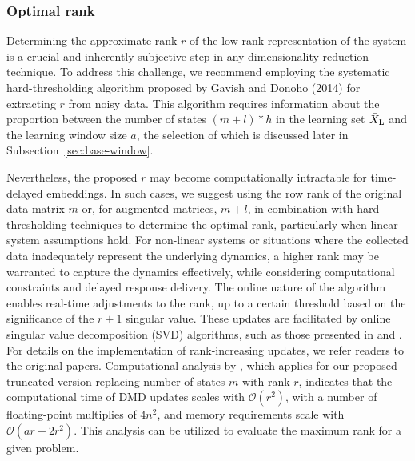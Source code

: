 \subsubsection{Optimal rank}
Determining the approximate rank \( r \) of the low-rank representation of the system is a crucial and inherently subjective step in any dimensionality reduction technique. To address this challenge, we recommend employing the systematic hard-thresholding algorithm proposed by Gavish and Donoho (2014) for extracting \( r \) from noisy data. This algorithm requires information about the proportion between the number of states \((m + l) * h\) in the learning set \(\bar{X} _{\text{L}}\) and the learning window size \(a\), the selection of which is discussed later in Subsection~\ref{sec:base-window}.

Nevertheless, the proposed \( r \) may become computationally intractable for time-delayed embeddings. In such cases, we suggest using the row rank of the original data matrix \( m \) or, for augmented matrices, \( m + l \), in combination with hard-thresholding techniques to determine the optimal rank, particularly when linear system assumptions hold. For non-linear systems or situations where the collected data inadequately represent the underlying dynamics, a higher rank may be warranted to capture the dynamics effectively, while considering computational constraints and delayed response delivery. The online nature of the algorithm enables real-time adjustments to the rank, up to a certain threshold based on the significance of the \(r + 1\) singular value. These updates are facilitated by online singular value decomposition (SVD) algorithms, such as those presented in \citet{Brand2006} and \citet{Zhang2022}. For details on the implementation of rank-increasing updates, we refer readers to the original papers. Computational analysis by \citet{Zhang2019}, which applies for our proposed truncated version replacing number of states \(m\) with rank \(r\), indicates that the computational time of DMD updates scales with \( \mathcal{O}(r^2) \), with a number of floating-point multiplies of \(4n^2\), and memory requirements scale with \( \mathcal{O}(a r + 2 r ^ 2) \). This analysis can be utilized to evaluate the maximum rank for a given problem.

